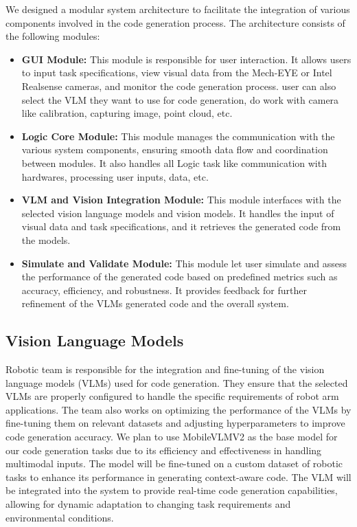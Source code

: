 \documentclass[conference]{IEEEtran}
\begin{document}
We designed a modular system architecture to facilitate the integration of various components involved in the code generation process.
The architecture consists of the following modules:
\begin{itemize}
    \item \textbf{GUI Module:} This module is responsible for user interaction. It allows users to input task specifications, view visual data from the Mech-EYE or Intel Realsense cameras, and monitor the code generation process.
    user can also select the VLM they want to use for code generation, do work with camera like calibration, capturing image, point cloud, etc.
    \item \textbf{Logic Core Module:} This module manages the communication with the various system components, ensuring smooth data flow and coordination between modules. It also handles all Logic task like communication with hardwares, processing user inputs, data, etc.
    \item \textbf{VLM and Vision Integration Module:} This module interfaces with the selected vision language models and vision models. It handles the input of visual data and task specifications, and it retrieves the generated code from the models. 
    \item \textbf{Simulate and Validate Module:} This module let user simulate and assess the performance of the generated code based on predefined metrics such as accuracy, efficiency, and robustness. It provides feedback for further refinement of the VLMs generated code and the overall system.
\end{itemize}   

\subsection{Vision Language Models}

Robotic team is responsible for the integration and fine-tuning of the vision language models (VLMs) used for code generation. They ensure that the selected VLMs are properly configured to handle the specific requirements of robot arm applications.
The team also works on optimizing the performance of the VLMs by fine-tuning them on relevant datasets and adjusting hyperparameters to improve code generation accuracy.
We plan to use MobileVLMV2\cite{chu2024mobilevlm} as the base model for our code generation tasks due to its efficiency and effectiveness in handling multimodal inputs. The model will be fine-tuned on a custom dataset of robotic tasks to enhance its performance in generating context-aware code.
The VLM will be integrated into the system to provide real-time code generation capabilities, allowing for
dynamic adaptation to changing task requirements and environmental conditions.
\end{document}
